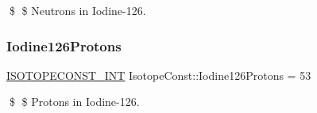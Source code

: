 \$ \$ Neutrons in Iodine-\/126. \mbox{\label{group___isotope_const-_iodine-_i126_ga39c5c2e22248883b1dfc8a3c0690004d}} 
\subsubsection{\texorpdfstring{Iodine126\+Protons}{Iodine126Protons}}
{\footnotesize\ttfamily \mbox{\hyperlink{group___isotope_const-_macros_ga5f18360b3e99483a35c32d789e62621c}{I\+S\+O\+T\+O\+P\+E\+C\+O\+N\+S\+T\+\_\+\+I\+NT}} Isotope\+Const\+::\+Iodine126\+Protons = 53}

\$ \$ Protons in Iodine-\/126. 